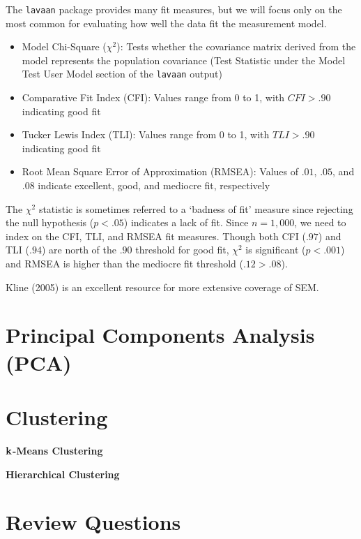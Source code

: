 \documentclass[
]{book}
\providecommand{\tightlist}{%
  \setlength{\itemsep}{0pt}\setlength{\parskip}{0pt}}
\begin{document}
The \texttt{lavaan} package provides many fit measures, but we will focus only on the most common for evaluating how well the data fit the measurement model.

\begin{itemize}
\tightlist
\item
  Model Chi-Square (\(\chi^2\)): Tests whether the covariance matrix derived from the model represents the population covariance (Test Statistic under the Model Test User Model section of the \texttt{lavaan} output)
\item
  Comparative Fit Index (CFI): Values range from 0 to 1, with \(CFI > .90\) indicating good fit
\item
  Tucker Lewis Index (TLI): Values range from 0 to 1, with \(TLI > .90\) indicating good fit
\item
  Root Mean Square Error of Approximation (RMSEA): Values of \(.01\), \(.05\), and \(.08\) indicate excellent, good, and mediocre fit, respectively
\end{itemize}

The \(\chi^2\) statistic is sometimes referred to a `badness of fit' measure since rejecting the null hypothesis (\(p < .05\)) indicates a lack of fit. Since \(n = 1,000\), we need to index on the CFI, TLI, and RMSEA fit measures. Though both CFI (\(.97\)) and TLI (\(.94\)) are north of the \(.90\) threshold for good fit, \(\chi^2\) is significant (\(p < .001\)) and RMSEA is higher than the mediocre fit threshold (\(.12 > .08\)).

Kline (2005) is an excellent resource for more extensive coverage of SEM.

\hypertarget{principal-components-analysis-pca}{%
\section{Principal Components Analysis (PCA)}\label{principal-components-analysis-pca}}

\hypertarget{clustering}{%
\section{Clustering}\label{clustering}}

\(\textbf k\)\textbf{-Means Clustering}

\textbf{Hierarchical Clustering}

\hypertarget{review-questions-11}{%
\section{Review Questions}\label{review-questions-11}}
\end{document}
